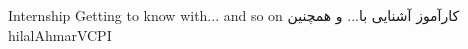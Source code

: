 
\voluntaryPositionC
{Internship}
{Getting to know with... and so on}
{کارآموز}
{آشنایی با... و همچنین}
{\parttime}
{}
{}
{hilalAhmarVCPI}
